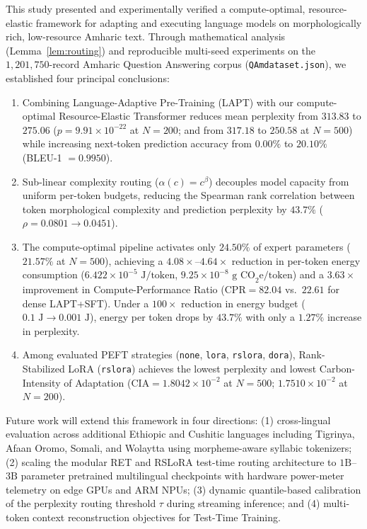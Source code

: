 \documentclass{interact}
\begin{document}
This study presented and experimentally verified a compute-optimal, resource-elastic framework for adapting and executing language models on morphologically rich, low-resource Amharic text. Through mathematical analysis (Lemma~\ref{lem:routing}) and reproducible multi-seed experiments on the $1,201,750$-record Amharic Question Answering corpus (\texttt{QAmdataset.json}), we established four principal conclusions:
\begin{enumerate}
    \item Combining Language-Adaptive Pre-Training (LAPT) with our compute-optimal Resource-Elastic Transformer reduces mean perplexity from $313.83$ to $275.06$ ($p = 9.91 \times 10^{-22}$ at $N=200$; and from $317.18$ to $250.58$ at $N=500$) while increasing next-token prediction accuracy from $0.00\%$ to $20.10\%$ (BLEU-1 $= 0.9950$).
    \item Sub-linear complexity routing ($\alpha(c) = c^{\beta}$) decouples model capacity from uniform per-token budgets, reducing the Spearman rank correlation between token morphological complexity and prediction perplexity by $43.7\%$ ($\rho = 0.0801 \to 0.0451$).
    \item The compute-optimal pipeline activates only $24.50\%$ of expert parameters ($21.57\%$ at $N=500$), achieving a $4.08\times$--$4.64\times$ reduction in per-token energy consumption ($6.422 \times 10^{-5}\text{ J/token}$, $9.25 \times 10^{-8}\text{ g CO}_2\text{e/token}$) and a $3.63\times$ improvement in Compute-Performance Ratio ($\text{CPR} = 82.04$ vs.\ $22.61$ for dense LAPT+SFT). Under a $100\times$ reduction in energy budget ($0.1\text{ J} \to 0.001\text{ J}$), energy per token drops by $43.7\%$ with only a $1.27\%$ increase in perplexity.
    \item Among evaluated PEFT strategies (\texttt{none}, \texttt{lora}, \texttt{rslora}, \texttt{dora}), Rank-Stabilized LoRA (\texttt{rslora}) achieves the lowest perplexity and lowest Carbon-Intensity of Adaptation ($\text{CIA} = 1.8042 \times 10^{-2}$ at $N=500$; $1.7510 \times 10^{-2}$ at $N=200$).
\end{enumerate}

Future work will extend this framework in four directions: (1) cross-lingual evaluation across additional Ethiopic and Cushitic languages including Tigrinya, Afaan Oromo, Somali, and Wolaytta using morpheme-aware syllabic tokenizers; (2) scaling the modular RET and RSLoRA test-time routing architecture to $1\text{B}$--$3\text{B}$ parameter pretrained multilingual checkpoints with hardware power-meter telemetry on edge GPUs and ARM NPUs; (3) dynamic quantile-based calibration of the perplexity routing threshold $\tau$ during streaming inference; and (4) multi-token context reconstruction objectives for Test-Time Training.
\end{document}
